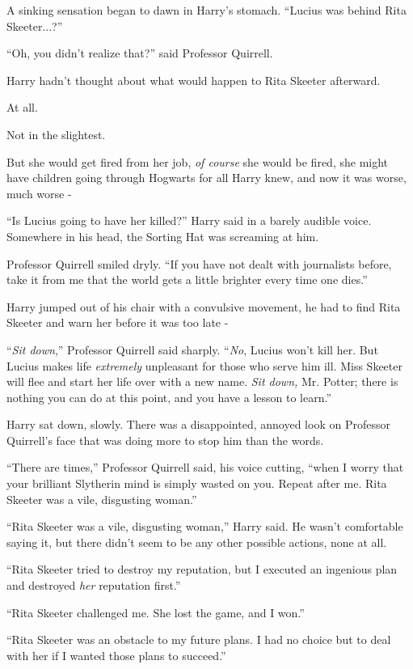 A sinking sensation began to dawn in Harry's stomach. ``Lucius was behind Rita Skeeter...?''

``Oh, you didn't realize that?'' said Professor Quirrell.

Harry hadn't thought about what would happen to Rita Skeeter afterward.

At all.

Not in the slightest.

But she would get fired from her job, \emph{of course} she would be fired, she might have children going through Hogwarts for all Harry knew, and now it was worse, much worse -

``Is Lucius going to have her killed?'' Harry said in a barely audible voice. Somewhere in his head, the Sorting Hat was screaming at him.

Professor Quirrell smiled dryly. ``If you have not dealt with journalists before, take it from me that the world gets a little brighter every time one dies.''

Harry jumped out of his chair with a convulsive movement, he had to find Rita Skeeter and warn her before it was too late -

``\emph{Sit down},'' Professor Quirrell said sharply. ``\emph{No}, Lucius won't kill her. But Lucius makes life \emph{extremely} unpleasant for those who serve him ill. Miss Skeeter will flee and start her life over with a new name. \emph{Sit down,} Mr. Potter; there is nothing you can do at this point, and you have a lesson to learn.''

Harry sat down, slowly. There was a disappointed, annoyed look on Professor Quirrell's face that was doing more to stop him than the words.

``There are times,'' Professor Quirrell said, his voice cutting, ``when I worry that your brilliant Slytherin mind is simply wasted on you. Repeat after me. Rita Skeeter was a vile, disgusting woman.''

``Rita Skeeter was a vile, disgusting woman,'' Harry said. He wasn't comfortable saying it, but there didn't seem to be any other possible actions, none at all.

``Rita Skeeter tried to destroy my reputation, but I executed an ingenious plan and destroyed \emph{her} reputation first.''

``Rita Skeeter challenged me. She lost the game, and I won.''

``Rita Skeeter was an obstacle to my future plans. I had no choice but to deal with her if I wanted those plans to succeed.''

